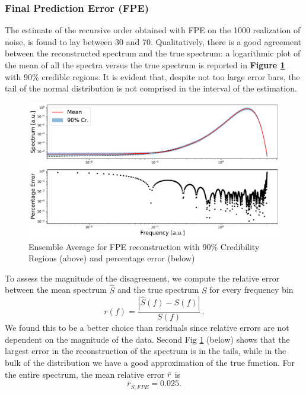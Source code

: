 \documentclass[twocolumn,showpacs,preprintnumbers,nofootinbib,prd,
superscriptaddress,10pt]{revtex4-1}
\begin{document}
\subsubsection{Final Prediction Error (FPE)}
The estimate of the recursive order obtained with FPE on the 1000 realization of noise, is found to lay between 30 and 70. Qualitatively, there is a good agreement between the reconstructed spectrum and the true spectrum: a logarithmic plot of the mean of all the spectra versus the true spectrum is reported in \textbf{Figure \ref{fig:FPEmean}} with 90\% credible regions. It is evident that, despite not too large error bars, the tail of the normal distribution is not comprised in the interval of the estimation. 
\begin{figure}[H]
    \centering
    \includegraphics[width = \linewidth]{Images/NormalPSD/FPEpsdAndResiduals.pdf}
    \caption{Ensemble Average for FPE reconstruction with 90\% Credibility Regions (above) and percentage error (below)}
    \label{fig:FPEmean}
\end{figure}
To assess the magnitude of the disagreement, we compute the relative error between the mean spectrum $\hat{S}$ and the true spectrum $S$ for every frequency bin
\begin{equation}
    \nonumber
    r(f) = \frac{|\hat{S}(f) - S(f)|}{S(f)}\,.
\end{equation}
We found this to be a better choice than residuals since relative errors are not dependent on the magnitude of the data. Second Fig \ref{fig:FPEmean} (below) shows that the largest error in the reconstruction of the spectrum is in the tails, while in the bulk of the distribution we have a good approximation of the true function. 
For the entire spectrum, the mean relative error $\Bar{r}$ is 
\begin{equation}
    \nonumber
    \bar{r}_{\bar S, FPE} = 0.025.
\end{equation}
\end{document}
